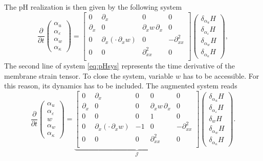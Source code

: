 \documentclass{ifacconf}
\begin{document}
The pH realization is then given by the following system
\begin{equation}\label{eq:pHsys}
	\frac{\partial}{\partial t}
	\begin{pmatrix}
		\alpha_u \\
		\alpha_\varepsilon \\
		\alpha_w \\
		\alpha_\kappa
	\end{pmatrix} = 
	\begin{bmatrix}
		0 & \partial_x & 0 & 0 \\
		\partial_x & 0 & \partial_x w \, \partial_x & 0 \\
		0 & \partial_x(\cdot \, \partial_x w) & 0 & -\partial_{xx}^2 \\
		0 & 0 & \partial_{xx}^2 & 0 \\ 
	\end{bmatrix}
	\begin{pmatrix}
		\delta_{\alpha_u} H \\
		\delta_{\alpha_\varepsilon} H \\
		\delta_{\alpha_w} H \\
		\delta_{\alpha_\kappa} H
	\end{pmatrix},
\end{equation}
The second line of system \eqref{eq:pHsys} represents the time derivative of the membrane strain tensor. To close the system, variable $w$ has to be accessible. For this reason, its dynamics has to be included. The augmented system reads
\begin{equation}\label{eq:pHsys_aug}
	\frac{\partial}{\partial t}
	\begin{pmatrix}
		\alpha_u \\
		\alpha_\varepsilon \\
		w \\
		\alpha_w \\
		\alpha_\kappa
	\end{pmatrix} = 
	\underbrace{\begin{bmatrix}
			0 & \partial_x & 0 & 0 & 0\\
			\partial_x & 0 & 0 &  \partial_x w \, \partial_x & 0 \\
			0 & 0 & 0 & 1 & 0 \\
			0 & \partial_x(\cdot \, \partial_x w) & -1 & 0 & -\partial_{xx}^2 \\
			0 & 0 & 0 & \partial_{xx}^2 & 0 \\ 
	\end{bmatrix}}_{\mathcal{J}}
	\begin{pmatrix}
		\delta_{\alpha_u} H \\
		\delta_{\alpha_\varepsilon} H \\
		\delta_{w} H \\
		\delta_{\alpha_w} H \\
		\delta_{\alpha_\kappa} H
	\end{pmatrix}.
\end{equation}
\end{document}
